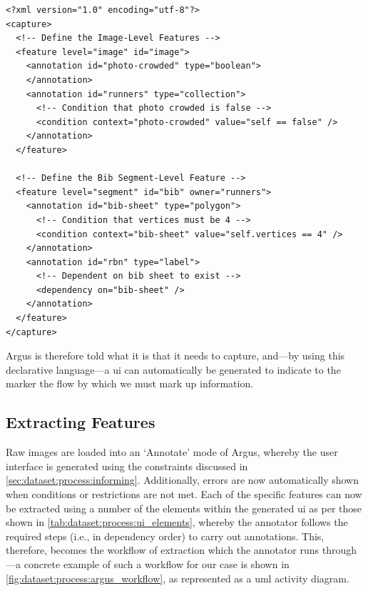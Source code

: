 \begin{lstlisting}[language=ACL, label=lst:dataset:process:acl_sample, caption={[Sample Argus Constraint Language File Format] A hypothetical \glsx{acl} file describing the image-level and $BibSheet$ segment-level features as represented in an \gls{xml} schema.}]
<?xml version="1.0" encoding="utf-8"?>
<capture>
  <!-- Define the Image-Level Features -->
  <feature level="image" id="image">
    <annotation id="photo-crowded" type="boolean">
    </annotation>
    <annotation id="runners" type="collection">
      <!-- Condition that photo crowded is false -->
      <condition context="photo-crowded" value="self == false" />
    </annotation>
  </feature>
  
  <!-- Define the Bib Segment-Level Feature -->
  <feature level="segment" id="bib" owner="runners">
    <annotation id="bib-sheet" type="polygon">
      <!-- Condition that vertices must be 4 -->
      <condition context="bib-sheet" value="self.vertices == 4" />
    </annotation>
    <annotation id="rbn" type="label">
      <!-- Dependent on bib sheet to exist -->
      <dependency on="bib-sheet" />
    </annotation>
  </feature>
</capture>
\end{lstlisting}

Argus is therefore told what it is that it needs to capture, and---by using this declarative language---a \gls{ui} can automatically be generated to indicate to the marker the flow by which we must mark up information. 

\subsection{Extracting Features}
\label{sec:dataset:process:extracting}

Raw images are loaded into an `Annotate' mode of Argus, whereby the user interface is generated using the constraints discussed in \cref{sec:dataset:process:informing}. Additionally, errors are now automatically shown when conditions or restrictions are not met. Each of the specific features can now be extracted using a number of the elements within the generated \gls{ui} as per those shown in \cref{tab:dataset:process:ui_elements}, whereby the annotator follows the required steps (i.e., in dependency order) to carry out annotations. This, therefore, becomes the workflow of extraction which the annotator runs through---a concrete example of such a workflow for our case is shown in \cref{fig:dataset:process:argus_workflow}, as represented as a \gls{uml} activity diagram.

